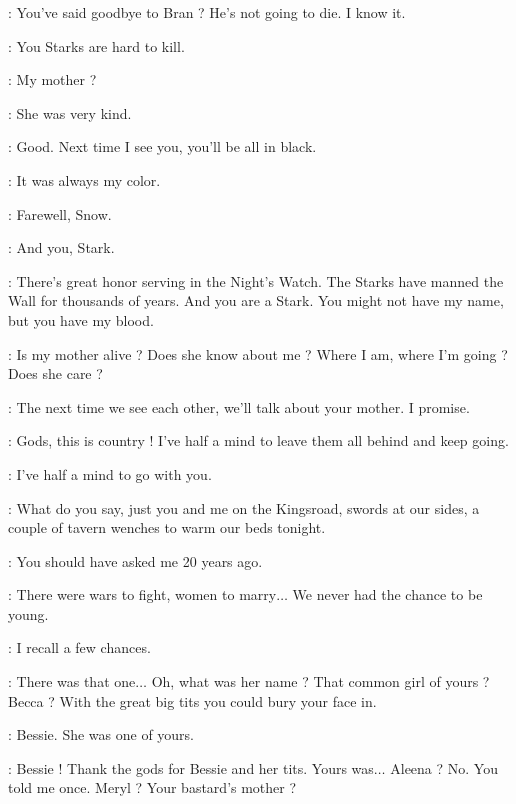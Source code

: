 \scene



\ROBB: You've said goodbye to Bran ? He's not going to die. I know it. 

\JON: You Starks are hard to kill. 

\ROBB: My mother ? 

\JON: She was very kind. 

\ROBB: Good. Next time I see you, you'll be all in black. 

\JON: It was always my color. 

\ROBB: Farewell, Snow. 

\JON: And you, Stark. 


\NED: There's great honor serving in the Night's Watch. The Starks have manned the Wall for thousands of years. And you are a Stark. You might not have my name, but you have my blood. 

\JON: Is my mother alive ? Does she know about me ? Where I am, where I'm going ? Does she care ? 

\NED: The next time we see each other, we'll talk about your mother. I promise. 

\scene



\ROBERT: Gods, this is country ! I've half a mind to leave them all behind and keep going. 

\NED: I've half a mind to go with you. 

\ROBERT: What do you say, just you and me on the Kingsroad, swords at our sides, a couple of tavern wenches to warm our beds tonight. 

\NED: You should have asked me 20 years ago. 

\ROBERT: There were wars to fight, women to marry$\ldots$ We never had the chance to be young. 

\NED: I recall a few chances. 

\ROBERT: There was that one$\ldots$ Oh, what was her name ? That common girl of yours ? Becca ? With the great big tits you could bury your face in. 

\NED: Bessie. She was one of yours. 

\ROBERT: Bessie ! Thank the gods for Bessie and her tits. Yours was$\ldots$ Aleena ? No. You told me once. Meryl ? Your bastard's mother ? 

